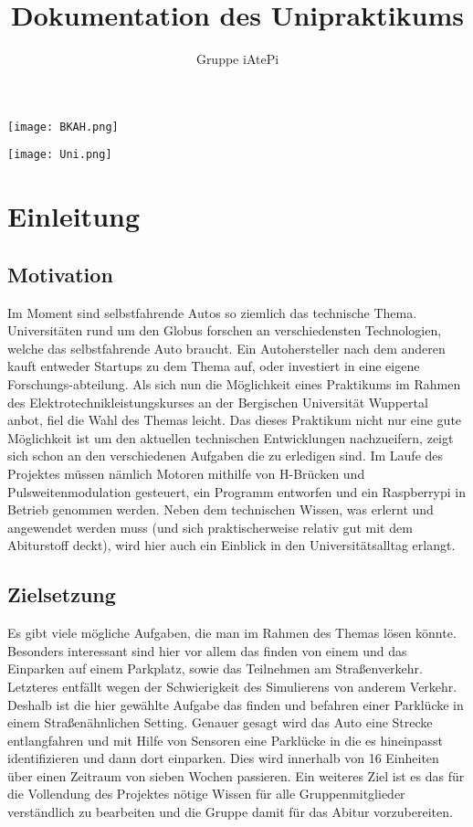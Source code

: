 \documentclass[notitlepage]{report}
\author{Gruppe iAtePi}
\title{Dokumentation des Unipraktikums}
\begin{document}
\maketitle
\texttt{[image: BKAH.png]}

\texttt{[image: Uni.png]}

\tableofcontents

\chapter{Einleitung}

\section{Motivation}
Im Moment sind selbstfahrende Autos so ziemlich das technische Thema. Universit\"{a}ten rund um den Globus forschen an verschiedensten Technologien, welche das selbstfahrende Auto braucht. Ein Autohersteller nach dem anderen kauft entweder Startups zu dem Thema auf, oder investiert in eine eigene Forschungs-abteilung. Als sich nun die M\"{o}glichkeit eines Praktikums im Rahmen des Elektrotechnikleistungskurses an der Bergischen Universit\"{a}t Wuppertal anbot, fiel die Wahl des Themas leicht. Das dieses Praktikum nicht nur eine gute M\"{o}glichkeit ist um den aktuellen technischen Entwicklungen nachzueifern, zeigt sich schon an den verschiedenen Aufgaben die zu erledigen sind. Im Laufe des Projektes m\"{u}ssen n\"{a}mlich Motoren mithilfe von H-Br\"{u}cken und Pulsweitenmodulation gesteuert, ein Programm entworfen und ein Raspberrypi in Betrieb genommen werden. Neben dem technischen Wissen, was erlernt und angewendet werden muss (und sich praktischerweise relativ gut mit dem Abiturstoff deckt), wird hier auch ein Einblick in den Universit\"{a}tsalltag erlangt.  
\section{Zielsetzung}
Es gibt viele m\"{o}gliche Aufgaben, die man im Rahmen des Themas l\"{o}sen k\"{o}nnte. Besonders interessant sind hier vor allem das finden von einem und das Einparken auf einem Parkplatz, sowie das Teilnehmen am Stra{\ss}enverkehr. Letzteres entf\"{a}llt wegen der Schwierigkeit des Simulierens von anderem Verkehr. Deshalb ist die hier gew\"{a}hlte Aufgabe das finden und befahren einer Parkl\"{u}cke in einem Stra{\ss}en\"{a}hnlichen Setting. Genauer gesagt wird das Auto eine Strecke entlangfahren und mit Hilfe von Sensoren eine Parkl\"{u}cke in die es hineinpasst identifizieren und dann dort einparken. Dies wird innerhalb von 16 Einheiten \"{u}ber einen Zeitraum von sieben Wochen passieren. Ein weiteres Ziel ist es das f\"{u}r die Vollendung des Projektes n\"{o}tige Wissen f\"{u}r alle Gruppenmitglieder verst\"{a}ndlich zu bearbeiten und die Gruppe damit f\"{u}r das Abitur vorzubereiten.
\end{document}
